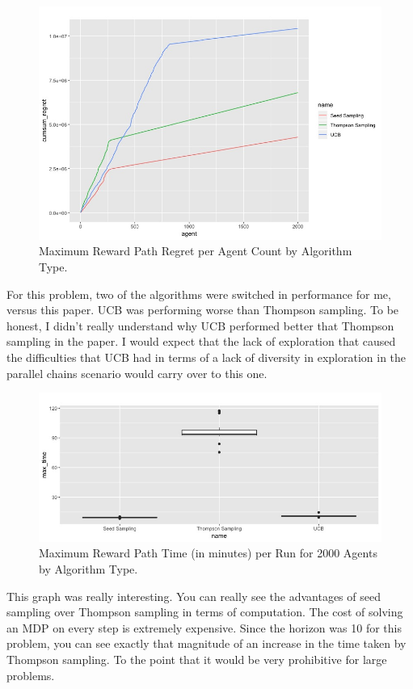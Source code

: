 \documentclass{article}
\begin{document}
\begin{figure}[htbp!]
  \centering
\includegraphics[scale=.3]{mr_regret_per_ag_per_algo.jpg}
  \caption{Maximum Reward Path Regret per Agent Count by Algorithm Type.}
 \label{fig:mr_regret_per_ag_per_algo}
\end{figure}
For this problem, two of the algorithms were switched in performance for me, versus this paper. UCB was performing worse than Thompson sampling.  To be honest, I didn't really understand why UCB performed better that Thompson sampling in the paper. I would expect that the lack of exploration that caused the difficulties that UCB had in terms of a lack of diversity in exploration in the parallel chains scenario would carry over to this one. 

\begin{figure}[htbp!]
  \centering
\includegraphics[scale=.3]{mr_max_time_per_ag_by_algo.jpg}

  \caption{Maximum Reward Path Time (in minutes) per Run for 2000 Agents by Algorithm Type.}
 \label{fig:mr_max_time_per_ag_by_algo}
\end{figure}
This graph was really interesting.  You can really see the advantages of seed sampling over Thompson sampling in terms of computation. The cost of solving an MDP on every step is extremely expensive. Since the horizon was 10 for this problem, you can see exactly that magnitude of an increase in the time taken by Thompson sampling. To the point that it would be very prohibitive for large problems. 
\end{document}
